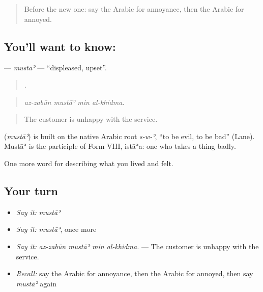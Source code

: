 \label{lesson:AR-C495-musta}



\begin{quote}
Before the new one: say the Arabic for annoyance, then the Arabic for annoyed.
\end{quote}

\subsection*{You'll want to know: }
\textbf{} — \emph{mustāʾ} — \textquotedblleft{}displeased, upset\textquotedblright{}.

\begin{quote}
   .
\end{quote}

\begin{quote}
\emph{az-zabūn mustāʾ min al-khidma.}
\end{quote}

\begin{quote}
The customer is unhappy with the service.
\end{quote}

\begin{cousinweb}
\textbf{} (\emph{mustāʾ}) is built on the native Arabic root \emph{s-w-ʾ}, \textquotedblleft{}to be evil, to be bad\textquotedblright{} (Lane). Mustāʾ is the participle of Form VIII, istāʾa: one who takes a thing badly.
\end{cousinweb}

\begin{grammarlens}[title={What you've built}]
One more word for describing what you lived and felt.
\end{grammarlens}

\subsection*{Your turn}
\begin{itemize}
\raggedright
  \item \emph{Say it:} \emph{mustāʾ}
  \item \emph{Say it:} \emph{mustāʾ}, once more
  \item \emph{Say it:} \emph{az-zabūn mustāʾ min al-khidma.} — The customer is unhappy with the service.
  \item \emph{Recall:} say the Arabic for annoyance, then the Arabic for annoyed, then say \emph{mustāʾ} again
\end{itemize}

